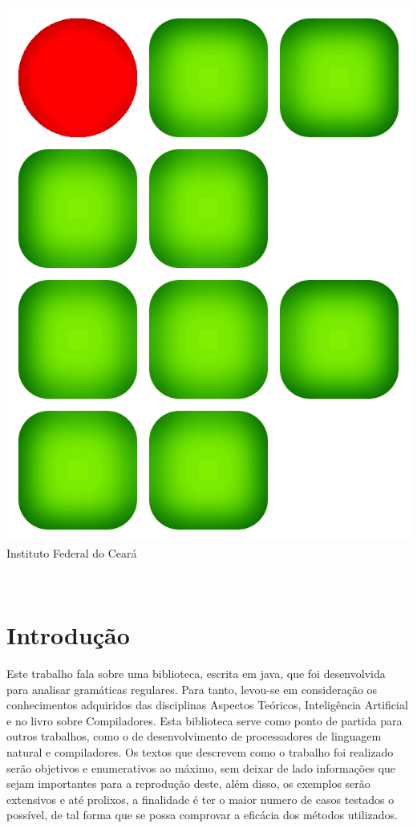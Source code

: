 \documentclass[12pt,a4paper,oneside,english,brazilian,brazil]{abntex2}
\renewcommand{\imprimircapa}{%
	\begin{capa}%
	\center
	\includegraphics[scale=0.2]{Imagens/logo} \\
	\ABNTEXchapterfont\Large Instituto Federal do Ceará \\
	\vspace*{1cm}
	{\ABNTEXchapterfont\large\imprimirautor}
	\vfill
	\begin{center}
	\ABNTEXchapterfont\bfseries\LARGE\imprimirtitulo
	\end{center}
	\vfill
	\large\imprimirlocal \\
	\large\imprimirdata
	\vspace*{1cm}
	\end{capa}
}
\begin{document}
\imprimircapa

\imprimirfolhaderosto

\tableofcontents
\cleardoublepage %


\pagebreak

\listoffigures
\cleardoublepage


\textual

    

\chapter{Introdução}

\par Este trabalho fala sobre uma biblioteca, escrita em java, que foi desenvolvida para analisar gramáticas regulares. Para tanto, levou-se em consideração os conhecimentos adquiridos das disciplinas Aspectos Teóricos, Inteligência Artificial  e no livro sobre Compiladores. Esta biblioteca serve como ponto de partida para outros trabalhos, como o de desenvolvimento de processadores de linguagem natural e compiladores. Os textos que descrevem como o trabalho foi realizado serão objetivos e enumerativos ao máximo, sem deixar de lado informações que sejam importantes para a reprodução deste, além disso, os exemplos serão extensivos e até prolixos, a finalidade é ter o maior numero de casos testados o possível, de tal forma que se possa comprovar a eficácia dos métodos utilizados. \
\end{document}
